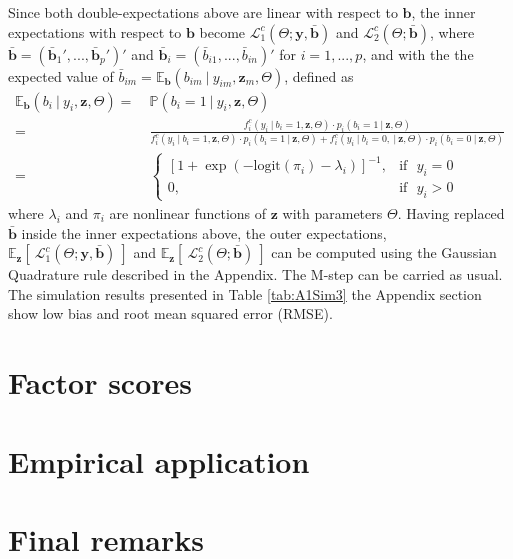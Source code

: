 \documentclass[11pt, a4paper]{article}
\newcommand{\cond}{\!~|~\!}
\begin{document}
Since both double-expectations above are linear with respect to $\mathbf{b}$, the inner expectations with respect to $\mathbf{b}$ become $\mathcal{L}_1^c(\Theta; \mathbf{y}, \bar{\mathbf{b}})$ and $\mathcal{L}_2^c(\Theta; \bar{\mathbf{b}})$, where $\bar{\mathbf{b}} = (\bar{\mathbf{b}}_1',...,\bar{\mathbf{b}}_p')'$ and $\bar{\mathbf{b}}_i = (\bar{b}_{i1},...,\bar{b}_{in})'$ for $i=1,...,p$, and with the the expected value of $\bar{b}_{im} = \mathbb{E}_\mathbf{b}(b_{im} \cond y_{im}, \mathbf{z}_m, \Theta)$, defined as
\begin{align*}
\mathbb{E}_\mathbf{b}(b_{i} \cond y_{i}, \mathbf{z}, \Theta) = & ~ \mathbb{P}(b_{i} = 1 \cond y_{i}, \mathbf{z}, \Theta)\\
= & ~ \frac{f_i^c(y_{i} \cond b_i = 1, \mathbf{z}, \Theta) \cdot p_i(b_{i} = 1 \cond \mathbf{z}, \Theta)} {f_i^c(y_{i} \cond b_i = 1, \mathbf{z}, \Theta) \cdot p_i(b_{i} = 1 \cond \mathbf{z}, \Theta) + f_i^c(y_{i} \cond b_i = 0, \cond \mathbf{z}, \Theta) \cdot p_i(b_{i} = 0 \cond \mathbf{z}, \Theta)} \\[5pt]
= & ~ \begin{cases}
\left[1 + \exp(-\text{logit}(\pi_i) - \lambda_i) \right]^{-1}, & \text{if ~} y_i = 0 \\
0, & \text{if ~} y_i > 0
\end{cases}
\end{align*}
where $\lambda_i$ and $\pi_i$ are nonlinear functions of $\mathbf{z}$ with parameters $\Theta$. Having replaced $\bar{\mathbf{b}}$ inside the inner expectations above, the outer expectations, $\mathbb{E}_{\mathbf{z}}\left[\!~\mathcal{L}_1^c(\Theta; \mathbf{y}, \bar{\mathbf{b}}) \!~\right]$ and $\mathbb{E}_{\mathbf{z}} \left[\!~\mathcal{L}_2^c(\Theta; \bar{\mathbf{b}})\!~\right]$ can be computed using the Gaussian Quadrature rule described in the Appendix. The M-step can be carried as usual. The simulation results presented in Table \ref{tab:A1Sim3} the Appendix section show low bias and root mean squared error (RMSE).


\section{Factor scores}

\section{Empirical application}

\section{Final remarks}
\end{document}
